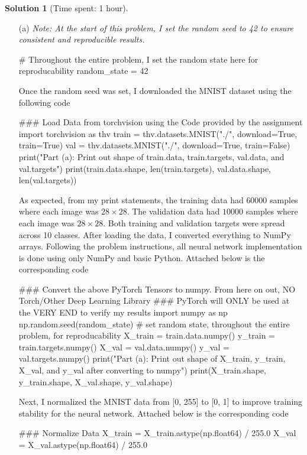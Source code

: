 \documentclass[11pt, reqno, letterpaper, twoside]{amsart}
\theoremstyle{plain}
\theoremstyle{definition}
\newtheorem{solution}[theorem]{Solution}
\begin{document}
\clearpage
\begin{solution}[Time spent: 1 hour]
\begin{enumerate}
    \item[(a)] 
    \textit{Note: At the start of this problem, I set the random seed to 42 to ensure consistent and reproducible results.} 
    \begin{python}
# Throughout the entire problem, I set the random state here for reproducability
random_state = 42
    \end{python}

Once the random seed was set, I downloaded the MNIST dataset using the following code 
\begin{python}
### Load Data from torchvision using the Code provided by the assignment
import torchvision as thv
train = thv.datasets.MNIST("./", download=True, train=True)
val = thv.datasets.MNIST("./", download=True, train=False)
print("Part (a): Print out shape of train.data, train.targets, val.data, and val.targets")
print(train.data.shape, len(train.targets), val.data.shape, len(val.targets))

\end{python}

As expected, from my print statements, the training data had $60000$ samples where each image was $28 \times 28$. The validation data had $10000$ samples where each image was $28 \times 28$. Both training and validation targets were spread across 10 classes. After loading the data, I converted everything to NumPy arrays. Following the problem instructions, all neural network implementation is done using only NumPy and basic Python. Attached below is the corresponding code
\begin{python}
### Convert the above PyTorch Tensors to numpy. From here on out, NO Torch/Other Deep Learning Library 
### PyTorch will ONLY be used at the VERY END to verify my results
import numpy as np
np.random.seed(random_state) # set random state, throughout the entire problem, for reproducability
X_train = train.data.numpy()
y_train = train.targets.numpy()
X_val = val.data.numpy()
y_val = val.targets.numpy()
print("Part (a): Print out shape of X_train, y_train, X_val, and y_val after converting to numpy")
print(X_train.shape, y_train.shape, X_val.shape, y_val.shape)
\end{python}

Next, I normalized the MNIST data from [0, 255] to [0, 1] to improve training stability for the neural network. Attached below is the corresponding code 
\begin{python}
    ### Normalize Data
X_train = X_train.astype(np.float64) / 255.0
X_val = X_val.astype(np.float64) / 255.0
\end{python}


\end{enumerate}
\end{solution}
\end{document}
